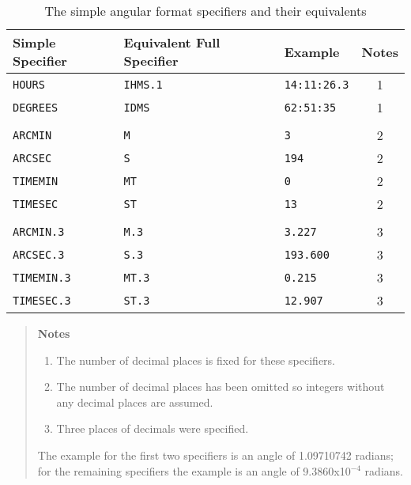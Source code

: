 \documentclass[twoside,11pt]{starlink}
\begin{document}
\begin{table}[htbp]

\begin{center}
\begin{tabular}{lllc}
Simple Specifier & Equivalent Full Specifier & Example & Notes \\ \hline
\texttt{HOURS}      & \texttt{IHMS.1} & \texttt{14:11:26.3} & 1  \\
\texttt{DEGREES}    & \texttt{IDMS}   & \texttt{62:51:35}   & 1  \\
                 &              &                  &    \\
\texttt{ARCMIN}     & \texttt{M}      & \texttt{3}          & 2  \\
\texttt{ARCSEC}     & \texttt{S}      & \texttt{194}        & 2  \\
\texttt{TIMEMIN}    & \texttt{MT}     & \texttt{0}          & 2  \\
\texttt{TIMESEC}    & \texttt{ST}     & \texttt{13}         & 2  \\
                 &              &                  &    \\
\texttt{ARCMIN.3}   & \texttt{M.3}    & \texttt{3.227}      & 3  \\
\texttt{ARCSEC.3}   & \texttt{S.3}    & \texttt{193.600}    & 3  \\
\texttt{TIMEMIN.3}  & \texttt{MT.3}   & \texttt{0.215}      & 3  \\
\texttt{TIMESEC.3}  & \texttt{ST.3}   & \texttt{12.907}     & 3  \\
\end{tabular}

\vspace{4mm}

\begin{quote}
\textbf{Notes}

\begin{enumerate}

  \item The number of decimal places is fixed for these specifiers.

  \item The number of decimal places has been omitted so integers
   without any decimal places are assumed.

  \item Three places of decimals were specified.

\end{enumerate}

The example for the first two specifiers is an angle of 1.09710742 radians;
for the remaining specifiers the example is an angle of 9.3860x10$^{-4}$
radians.

\end{quote}

\caption{\label{SEXAG_SIMPLE}The simple angular format specifiers and
their equivalents}
\end{center}

\end{table}
\end{document}
